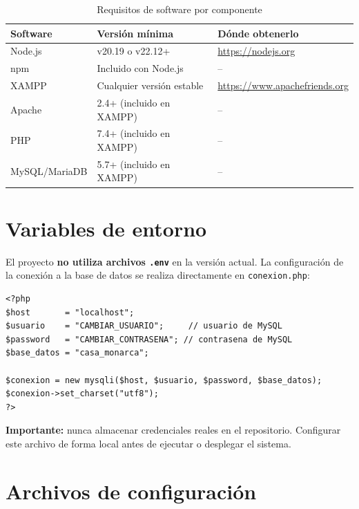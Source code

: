 \documentclass[10pt,letterpaper]{report}
\begin{document}
\begin{table}[H]
\centering
\caption{Requisitos de software por componente}
\label{tab:requisitos}
\begin{tabular}{p{} p{} p{}}
\toprule
\textbf{Software} & \textbf{Versión mínima} & \textbf{Dónde obtenerlo} \\
\midrule
Node.js & v20.19 o v22.12+ & \url{https://nodejs.org} \\
npm & Incluido con Node.js & -- \\
XAMPP & Cualquier versión estable & \url{https://www.apachefriends.org} \\
Apache & 2.4+ (incluido en XAMPP) & -- \\
PHP & 7.4+ (incluido en XAMPP) & -- \\
MySQL/MariaDB & 5.7+ (incluido en XAMPP) & -- \\
\bottomrule
\end{tabular}
\end{table}

\section{Variables de entorno}

El proyecto \textbf{no utiliza archivos \texttt{.env}} en la versión actual. La configuración de la conexión a la base de datos se realiza directamente en \texttt{conexion.php}:

\begin{lstlisting}[style=phpstyle, caption={Archivo conexion.php — variables de configuración}]
<?php
$host       = "localhost";
$usuario    = "CAMBIAR_USUARIO";     // usuario de MySQL
$password   = "CAMBIAR_CONTRASENA"; // contrasena de MySQL
$base_datos = "casa_monarca";

$conexion = new mysqli($host, $usuario, $password, $base_datos);
$conexion->set_charset("utf8");
?>
\end{lstlisting}

\textbf{Importante:} nunca almacenar credenciales reales en el repositorio. Configurar este archivo de forma local antes de ejecutar o desplegar el sistema.

\section{Archivos de configuración}
\end{document}

